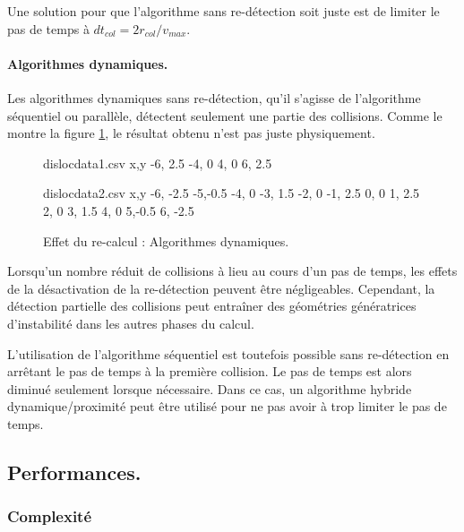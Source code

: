 \documentclass[11pt,class=article,float=false,crop=false]{standalone}
\begin{document}
Une solution pour que l'algorithme sans re-détection soit juste est de limiter le pas de temps à $dt_{col} = 2r_{col}/v_{max}$.

\paragraph{Algorithmes dynamiques.}

Les algorithmes dynamiques sans re-détection, qu'il s'agisse de l'algorithme séquentiel ou parallèle, détectent seulement une partie des collisions. Comme le montre la figure \ref{fig:frankread_noredetect_dynamique}, le résultat obtenu n'est pas juste physiquement. 

\begin{figure}[H]
	\centering
	\begin{filecontents*}{dislocdata1.csv}
		x,y
		-6, 2.5
		-4, 0
		 4, 0
		 6, 2.5
	\end{filecontents*}
	\begin{filecontents*}{dislocdata2.csv}
		x,y
		-6, -2.5
		-5,-0.5
		-4, 0
		-3, 1.5
		-2, 0
		-1, 2.5
		 0, 0
		 1, 2.5
		 2, 0
		 3, 1.5		 
		 4, 0
		 5,-0.5
		 6, -2.5
	\end{filecontents*}
	\caption{Effet du re-calcul : Algorithmes dynamiques.}
	\label{fig:frankread_noredetect_dynamique}
\end{figure}

Lorsqu'un nombre réduit de collisions à lieu au cours d'un pas de temps, les effets de la désactivation de la re-détection peuvent être négligeables. Cependant, la détection partielle des collisions peut entraîner des géométries génératrices d'instabilité dans les autres phases du calcul.

L'utilisation de l'algorithme séquentiel est toutefois possible sans re-détection en arrêtant le pas de temps à la première collision. Le pas de temps est alors diminué seulement lorsque nécessaire. Dans ce cas, un algorithme hybride dynamique/proximité peut être utilisé pour ne pas avoir à trop limiter le pas de temps.

\subsection{Performances.}

\subsubsection{Complexité}
\end{document}
